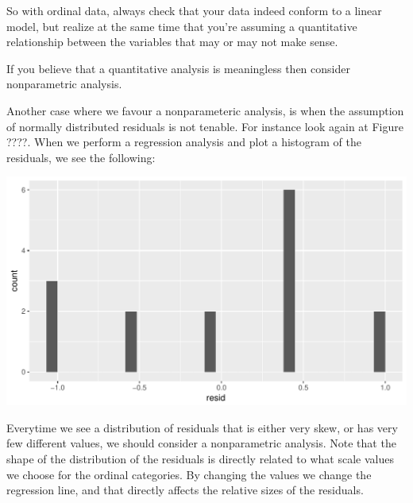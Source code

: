 \documentclass[]{report}\usepackage[]{graphicx}\usepackage[]{color}
\makeatletter
\def\maxwidth{ %
  \ifdim\Gin@nat@width>\linewidth
    \linewidth
  \else
    \Gin@nat@width
  \fi
}
\newenvironment{kframe}{%
 \def\at@end@of@kframe{}%
 \ifinner\ifhmode%
  \def\at@end@of@kframe{\end{minipage}}%
  \begin{minipage}{\columnwidth}%
 \fi\fi%
 \def\FrameCommand##1{\hskip\@totalleftmargin \hskip-\fboxsep
 \colorbox{shadecolor}{##1}\hskip-\fboxsep
     \hskip-\linewidth \hskip-\@totalleftmargin \hskip\columnwidth}%
 \MakeFramed {\advance\hsize-\width
   \@totalleftmargin\z@ \linewidth\hsize
   \@setminipage}}%
 {\par\unskip\endMakeFramed%
 \at@end@of@kframe}
\newenvironment{knitrout}{}{} %
\makeatother
\begin{document}
So with ordinal data, always check that your data indeed conform to a linear model, but realize at the same time that you're assuming a quantitative relationship between the variables that may or may not make sense. 

If you believe that a quantitative analysis is meaningless then consider nonparametric analysis. 

Another case where we favour a nonparameteric analysis, is when the assumption of normally distributed residuals is not tenable. For instance look again at Figure ????. When we perform a regression analysis and plot a histogram of the residuals, we see the following:

\begin{knitrout}
\color{fgcolor}\begin{kframe}


{\ttfamily\noindent\itshape\color{messagecolor}{\#\# `stat\_bin()` using `bins = 30`. Pick better value with `binwidth`.}}\end{kframe}

{\centering \includegraphics[width=\maxwidth]{figure/table1201-1} 

}



\end{knitrout}

Everytime we see a distribution of residuals that is either very skew, or has very few different values, we should consider a nonparametric analysis. Note that the shape of the distribution of the residuals is directly related to what scale values we choose for the ordinal categories. By changing the values we change the regression line, and that directly affects the relative sizes of the residuals. 
\end{document}
